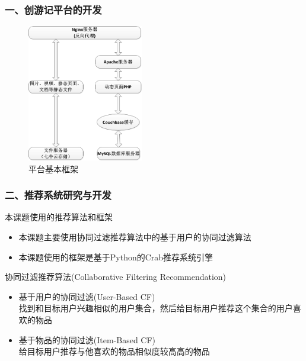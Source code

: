\documentclass{beamer}
\begin{document}
\begin{frame}
  \frametitle{一、创游记平台的开发}
  \begin{figure}
    \centering
      \includegraphics[height=6cm]{./img/web_frame2.png}
    \caption{平台基本框架}
    \label{fig:visual}
  \end{figure}
\end{frame}

\begin{frame}
\frametitle{二、\cite{crab1}推荐系统研究与开发}
  \begin{block}{本课题使用的推荐算法和框架}
    \begin{itemize}
      \item 本课题主要使用协同过滤推荐算法中的基于用户的协同过滤算法
      \item \cite{crab2}本课题使用的框架是基于Python的Crab推荐系统引擎
    \end{itemize}
  \end{block}
  \begin{block}{协同过滤推荐算法(Collaborative Filtering Recommendation)}
    \begin{itemize}
      \item 基于用户的协同过滤(User-Based CF)\\
      找到和目标用户兴趣相似的用户集合，然后给目标用户推荐这个集合的用户喜欢的物品
      \item 基于物品的协同过滤(Item-Based CF)\\
      给目标用户推荐与他喜欢的物品相似度较高高的物品\\
    \end{itemize}
  \end{block}
\end{frame}
\end{document}
